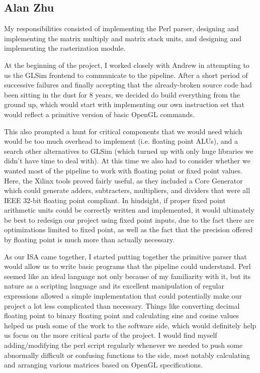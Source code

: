 \documentclass[letterpaper,10pt]{article}
\begin{document}
\subsection{Alan Zhu}
My responsibilities consisted of implementing the Perl parser, designing and implementing the matrix multiply and matrix stack units, and designing and implementing the rasterization module.

At the beginning of the project, I worked closely with Andrew in attempting to us the GLSim frontend to communicate to the pipeline. After a short period of successive failures and finally accepting that the already-broken source code had been sitting in the dust for 8 years, we decided do build everything from the ground up, which would start with implementing our own instruction set that would reflect a primitive version of basic OpenGL commands. 

This also prompted a hunt for critical components that we would need which would be too much overhead to implement (i.e. floating point ALUs), and a search other alternatives to GLSim (which turned up with only huge libraries we didn't have time to deal with). At this time we also had to consider whether we wanted most of the pipeline to work with floating point or fixed point values. Here, the Xilinx tools proved fairly useful, as they included a Core Generator which could generate adders, subtracters, multipliers, and dividers that were all IEEE 32-bit floating point compliant. In hindsight, if proper fixed point arithmetic units could be correctly written and implemented, it would ultimately be best to redesign our project using fixed point inputs, due to the fact there are optimizations limited to fixed point, as well as the fact that the precision offered by floating point is much more than actually necessary.

As our ISA came together, I started putting together the primitive parser that would allow us to write basic programs that the pipeline could understand. Perl seemed like an ideal language not only because of my familiarity with it, but its nature as a scripting language and its excellent manipulation of regular expressions allowed a simple implementation that could potentially make our project a lot less complicated than necessary. Things like converting decimal floating point to binary floating point and calculating sine and cosine values helped us push some of the work to the software side, which would definitely help us focus on the more critical parts of the project. I would find myself adding/modifying the perl script regularly whenever we needed to push some abnormally difficult or confusing functions to the side, most notably calculating and arranging various matrices based on OpenGL specifications.
\end{document}
